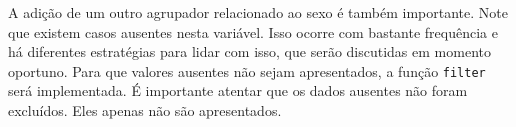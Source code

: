 \documentclass[
]{book}
\newenvironment{Shaded}{\begin{snugshade}}{\end{snugshade}}
\newcommand{\KeywordTok}[1]{\textcolor[rgb]{0.13,0.29,0.53}{\textbf{#1}}}
\newcommand{\NormalTok}[1]{#1}
\newcommand{\OperatorTok}[1]{\textcolor[rgb]{0.81,0.36,0.00}{\textbf{#1}}}
\newcommand{\StringTok}[1]{\textcolor[rgb]{0.31,0.60,0.02}{#1}}
\begin{document}
A adição de um outro agrupador relacionado ao sexo é também importante. Note que existem casos ausentes nesta variável. Isso ocorre com bastante frequência e há diferentes estratégias para lidar com isso, que serão discutidas em momento oportuno. Para que valores ausentes não sejam apresentados, a função \texttt{filter} será implementada. É importante atentar que os dados ausentes não foram excluídos. Eles apenas não são apresentados.

\begin{Shaded}
\end{Shaded}
\end{document}
